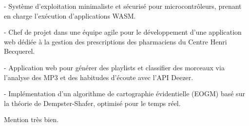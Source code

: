 \documentclass[10pt,a4paper,ragged2e,withhyper]{../AltaCV/altacv}
\begin{document}
\begin{paracol}{2}
  
  \begin{minipage}[t]{0.49\linewidth}
    {\small {} - Système d'exploitation minimaliste et sécurisé pour microcontrôleurs, prenant en charge l’exécution d’applications WASM.}

    \divider

    {\small {} - Chef de projet dans une équipe agile pour le développement d'une application web dédiée à la gestion des prescriptions des pharmaciens du Centre Henri Becquerel.}
  \end{minipage}
  \hfill
  \begin{minipage}[t]{0.49\linewidth}
    {\small {} - Application web pour générer des playlists et classifier des morceaux via l’analyse des MP3 et des habitudes d’écoute avec l’API Deezer.}

    \divider

    {\small {} - Implémentation d’un algorithme de cartographie évidentielle (EOGM) basé sur la théorie de Dempster-Shafer, optimisé pour le temps réel.}
  \end{minipage}

  \medskip

  \switchcolumn



  \divider

  Mention très bien.

  \divider





\end{paracol}
\end{document}
